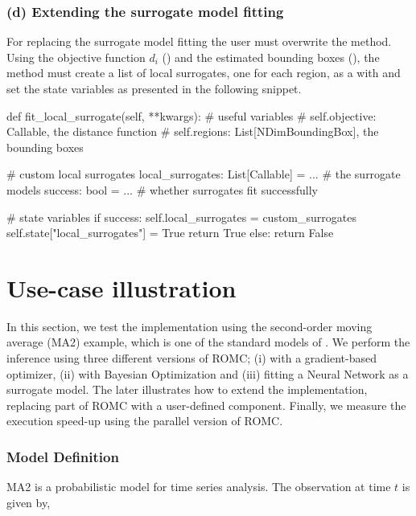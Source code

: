\documentclass[nojss]{jss}
\begin{document}
\subsubsection*{(d) Extending the surrogate model fitting}

For replacing the surrogate model fitting the user must overwrite the
 method. Using the objective function
\(d_i\) () and the estimated bounding boxes
(), the method must create a list of local
surrogates, one for each region, as a  with
 and set the state variables as presented in the
following snippet.

\begin{Code}
def fit_local_surrogate(self, **kwargs):
    # useful variables
    # self.objective: Callable, the distance function
    # self.regions: List[NDimBoundingBox], the bounding boxes

    # custom local surrogates
    local_surrogates: List[Callable] = ... # the surrogate models
    success: bool = ... # whether surrogates fit successfully

    # state variables
    if success:
        self.local_surrogates = custom_surrogates
        self.state["local_surrogates"] = True
        return True
    else:
        return False
\end{Code}


\section{Use-case illustration}

In this section, we test the implementation using the second-order
moving average (MA2) example, which is one of the standard models of
. We perform the inference using three different versions of
ROMC; (i) with a gradient-based optimizer, (ii) with Bayesian
Optimization and (iii) fitting a Neural Network as a surrogate
model. The later illustrates how to extend the implementation,
replacing part of ROMC with a user-defined component. Finally, we
measure the execution speed-up using the parallel version of ROMC.

\subsubsection*{Model Definition}

MA2 is a probabilistic model for time series analysis. The observation
at time \(t\) is given by,
\end{document}
